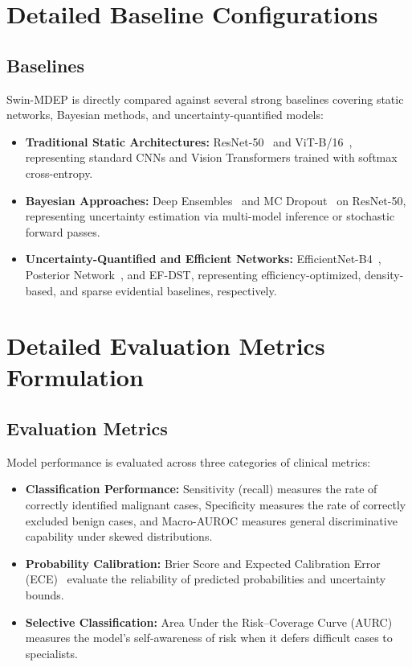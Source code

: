 \documentclass[letterpaper]{article} %
\begin{document}
\section{Detailed Baseline Configurations}
\subsection{Baselines}\label{subsec:baselines}

Swin-MDEP is directly compared against several strong baselines covering static networks, Bayesian methods, and uncertainty-quantified models:
\begin{itemize}
    \item \textbf{Traditional Static Architectures:} ResNet-50~\cite{he2016deep} and ViT-B/16~\cite{dosovitskiy2021image}, representing standard CNNs and Vision Transformers trained with softmax cross-entropy.
    \item \textbf{Bayesian Approaches:} Deep Ensembles~\cite{lakshminarayanan2017simple} and MC Dropout~\cite{gal2016dropout} on ResNet-50, representing uncertainty estimation via multi-model inference or stochastic forward passes.
    \item \textbf{Uncertainty-Quantified and Efficient Networks:} EfficientNet-B4~\cite{tan2019efficientnet}, Posterior Network~\cite{charpentier2020posterior}, and EF-DST, representing efficiency-optimized, density-based, and sparse evidential baselines, respectively.
\end{itemize}


\section{Detailed Evaluation Metrics Formulation}
\subsection{Evaluation Metrics}\label{subsec:metrics}

Model performance is evaluated across three categories of clinical metrics:
\begin{itemize}
    \item \textbf{Classification Performance:} Sensitivity (recall) measures the rate of correctly identified malignant cases, Specificity measures the rate of correctly excluded benign cases, and Macro-AUROC measures general discriminative capability under skewed distributions.
    \item \textbf{Probability Calibration:} Brier Score and Expected Calibration Error (ECE)~\cite{naeini2015obtaining} evaluate the reliability of predicted probabilities and uncertainty bounds.
    \item \textbf{Selective Classification:} Area Under the Risk--Coverage Curve (AURC)~\cite{geifman2017selective, geifman2019selectivenet, jaeger2023call} measures the model's self-awareness of risk when it defers difficult cases to specialists.
\end{itemize}
\end{document}
